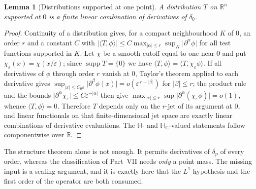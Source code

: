 \documentclass[11pt,a4paper]{article}
\numberwithin{equation}{section}
\newtheorem{lemma}[theorem]{Lemma}
\theoremstyle{definition}
\theoremstyle{remark}
\theoremstyle{plain}
\newcommand{\HH}{\mathbb H}
\newcommand{\HC}{\mathbb H_{\mathbb C}}
\newcommand{\RR}{\mathbb R}
\newcommand{\abs}[1]{\lvert #1\rvert}
\begin{document}
\begin{lemma}[Distributions supported at one point]
\label{f:lem:point-support}
A distribution $T$ on $\RR^n$ supported at $0$ is a finite linear
combination of derivatives of $\delta_0$.
\end{lemma}
\begin{proof}
Continuity of a distribution gives, for a compact neighbourhood $K$ of $0$,
an order $r$ and a constant $C$ with
$\abs{\langle T,\phi\rangle}\le
C\max_{\abs\alpha\le r}\sup_K\abs{\partial^\alpha\phi}$
for all test functions supported in $K$. Let $\chi$ be a smooth cutoff
equal to one near $0$ and put $\chi_\varepsilon(x)=\chi(x/\varepsilon)$;
since $\operatorname{supp}T=\{0\}$ we have
$\langle T,\phi\rangle=\langle T,\chi_\varepsilon\phi\rangle$.
If all derivatives of $\phi$ through order $r$ vanish at $0$, Taylor's
theorem applied to each derivative gives
$\sup_{\abs x\le C_0\varepsilon}\abs{\partial^\beta\phi(x)}
=o(\varepsilon^{\,r-\abs\beta})$ for $\abs\beta\le r$; the product rule and
the bounds $\abs{\partial^\alpha\chi_\varepsilon}\le
C\varepsilon^{-\abs\alpha}$ then give
$\max_{\abs\alpha\le r}\sup\abs{\partial^\alpha(\chi_\varepsilon\phi)}
=o(1)$, whence $\langle T,\phi\rangle=0$. Therefore $T$ depends only on
the $r$-jet of its argument at $0$, and linear functionals on that
finite-dimensional jet space are exactly linear combinations of derivative
evaluations. The $\HH$- and $\HC$-valued statements follow componentwise
over $\RR$.
\end{proof}

The structure theorem alone is not enough. It permits derivatives of
$\delta_p$ of every order, whereas the classification of Part~VII needs
\emph{only} a point mass. The missing input is a scaling argument, and it
is exactly here that the $L^1$ hypothesis and the first order of the
operator are both consumed.
\end{document}
